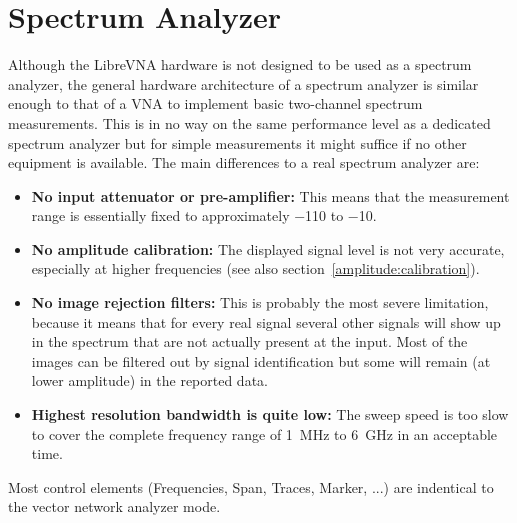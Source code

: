 \documentclass[a4paper,11pt]{article}
\newcommand{\vna}{LibreVNA}
\begin{document}
\section{Spectrum Analyzer}
Although the \vna{} hardware is not designed to be used as a spectrum analyzer, the general hardware architecture of a spectrum analyzer is similar enough to that of a VNA to implement basic two-channel spectrum measurements. This is in no way on the same performance level as a dedicated spectrum analyzer but for simple measurements it might suffice if no other equipment is available. The main differences to a real spectrum analyzer are:
\begin{itemize}
\item \textbf{No input attenuator or pre-amplifier:} This means that the measurement range is essentially fixed to approximately \SI{-110}{\dBm} to \SI{-10}{\dBm}.
\item \textbf{No amplitude calibration:} The displayed signal level is not very accurate, especially at higher frequencies (see also section~\ref{amplitude:calibration}).
\item \textbf{No image rejection filters:} This is probably the most severe limitation, because it means that for every real signal several other signals will show up in the spectrum that are not actually present at the input. Most of the images can be filtered out by signal identification but some will remain (at lower amplitude) in the reported data.
\item \textbf{Highest resolution bandwidth is quite low:} The sweep speed is too slow to cover the complete frequency range of \SI{1}{\mega\hertz} to \SI{6}{\giga\hertz} in an acceptable time.
\end{itemize}

Most control elements (Frequencies, Span, Traces, Marker, ...) are indentical to the vector network analyzer mode.
\end{document}
